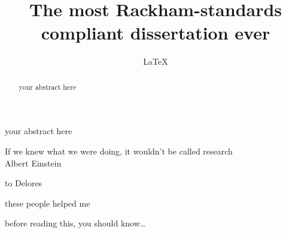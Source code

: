 \documentclass[12pt, letterpaper]{umthesis}
\author{\LaTeX}
\title{The most Rackham-standards compliant dissertation ever}
\DeclareRobustCommand\dash{%
\unskip\nobreak\thinspace\textemdash\thinspace\ignorespaces}
\begin{document}
\frontmatter


\maketitle
\begin{finalabstract}
  your abstract here
\end{finalabstract}
\makecopyright

\begin{frontispiece}
  If we knew what we were doing, it wouldn't be called research\\
  \dash Albert Einstein
\end{frontispiece}

\begin{dedication}
  to Delores
\end{dedication}

\begin{acknowledgments}
  these people helped me
\end{acknowledgments}

\begin{preface}
  before reading this, you should know\dots
\end{preface}

\tableofcontents

\listoftables
\listoffigures
\listofappendices

\begin{abstract}
  your abstract here
\end{abstract}
\mainmatter





\appendix


\backmatter

\end{document}
